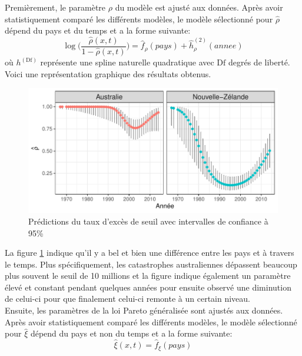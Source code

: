 Premièrement, le paramètre $\rho$ du modèle est ajusté aux données. Après avoir statistiquement comparé les différents modèles, le modèle sélectionné pour $\hat\rho$ dépend du pays et du temps et a la forme suivante:
\begin{equation}\label{eq:3.3.1}
\log\Bigg(\frac{\hat\rho(x,t)}{1-\hat\rho(x,t)}\Bigg) = \hat{f}_\rho(pays) + \hat{h}^{(2)}_\rho(annee)
\end{equation}
où ${h}^{(\text{Df})}$ représente une spline naturelle quadratique avec $\text{Df}$ degrés de liberté.
\\


Voici une représentation graphique des résultats obtenus.
\begin{figure}[h]
\begin{center}
\includegraphics{images/fig-013}
\end{center}
\caption{Prédictions du taux d'excès de seuil avec intervalles de confiance à 95\%}
\label{fig:3.7}
\end{figure}

La figure \ref{fig:3.7} indique qu'il y a bel et bien une différence entre les pays et à travers le temps. Plus spécifiquement, les catastrophes australiennes dépassent beaucoup plus souvent le seuil de 10 millions et la figure indique également un paramètre élevé et constant pendant quelques années pour ensuite observé une diminution de celui-ci pour que finalement celui-ci remonte à un certain niveau.
\\

Ensuite, les paramètres de la loi Pareto généralisée sont ajustés aux données. Après avoir statistiquement comparé les différents modèles, le modèle sélectionné pour $\hat\xi$ dépend du pays et non du temps et a la forme suivante:
\begin{equation}\label{eq:3.3.2}
\hat\xi(x,t) = \hat{f}_\xi(pays)
\end{equation}

